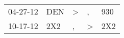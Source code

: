 \begin{supertabular}{p{0.07\textwidth}p{0.06\textwidth}p{0.02\textwidth}p{0.02\textwidth}p{0.06\textwidth}}
 04-27-12\textsuperscript{} &  DEN\textsuperscript{} &  \textgreater &             , &  930\textsuperscript{} \\
 10-17-12\textsuperscript{} &  2X2\textsuperscript{} &             , &  \textgreater &  2X2\textsuperscript{} \\
\end{supertabular}
